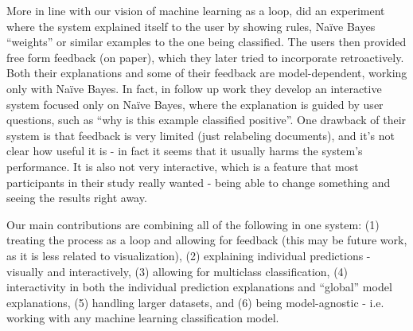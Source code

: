 \documentclass{chi2009}
\begin{document}
More in line with our vision of machine learning as a loop,
\cite{Stumpf:2009:IMM:1555003.1555106} did an experiment where the system
explained itself to the user by showing rules, Na\"{i}ve Bayes ``weights'' or
similar examples to the one being classified. The users then provided free form
feedback (on paper), which they later tried to incorporate retroactively. Both
their explanations and some of their feedback are model-dependent, working only
with Na\"{i}ve Bayes. In fact, in follow up work
\cite{Kulesza:2011:WED:2030365.2030367} they develop an interactive system
focused only on Na\"{i}ve Bayes, where the explanation is guided by user questions,
such as ``why is this example classified positive''. One drawback of their
system is that feedback is very limited (just relabeling documents), and it's
not clear how useful it is - in fact it seems that it usually harms the
system's performance. It is also not very interactive, which is a feature that
most participants in their study really wanted - being able to change something
and seeing the results right away. 

Our main contributions are combining all of the following in one system: (1)
treating the process as a loop and allowing for feedback (this may be future
work, as it is less related to visualization), (2) explaining individual
predictions - visually and interactively, (3) allowing for multiclass
classification, (4) interactivity in both the individual prediction explanations
and ``global'' model explanations, (5) handling larger datasets, and (6) being
model-agnostic - i.e. working with any machine learning classification model.
\pagebreak
\end{document}
